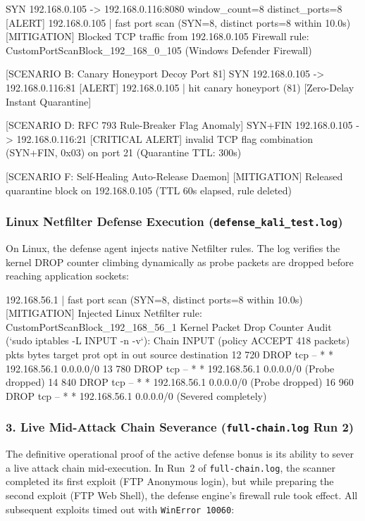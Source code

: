 \begin{logbox}
SYN 192.168.0.105 -> 192.168.0.116:8080  window_count=8  distinct_ports=8
[ALERT] 192.168.0.105 | fast port scan (SYN=8, distinct ports=8 within 10.0s)
[MITIGATION] Blocked TCP traffic from 192.168.0.105
             Firewall rule: CustomPortScanBlock_192_168_0_105 (Windows Defender Firewall)

[SCENARIO B: Canary Honeyport Decoy Port 81]
SYN 192.168.0.105 -> 192.168.0.116:81
[ALERT] 192.168.0.105 | hit canary honeyport (81)  [Zero-Delay Instant Quarantine]

[SCENARIO D: RFC 793 Rule-Breaker Flag Anomaly]
SYN+FIN 192.168.0.105 -> 192.168.0.116:21
[CRITICAL ALERT] invalid TCP flag combination (SYN+FIN, 0x03) on port 21 (Quarantine TTL: 300s)

[SCENARIO F: Self-Healing Auto-Release Daemon]
[MITIGATION] Released quarantine block on 192.168.0.105 (TTL 60s elapsed, rule deleted)
\end{logbox}

\subsubsection{Linux Netfilter Defense Execution (\texttt{defense\_kali\_test.log})}
On Linux, the defense agent injects native Netfilter rules. The log verifies the kernel DROP counter
climbing dynamically as probe packets are dropped before reaching application sockets:

\begin{logbox}
[ALERT] 192.168.56.1 | fast port scan (SYN=8, distinct ports=8 within 10.0s)
[MITIGATION] Injected Linux Netfilter rule: CustomPortScanBlock_192_168_56_1
Kernel Packet Drop Counter Audit (`sudo iptables -L INPUT -n -v`):
  Chain INPUT (policy ACCEPT 418 packets)
  pkts bytes target     prot opt in     out     source          destination
    12   720 DROP       tcp  --  *      *       192.168.56.1    0.0.0.0/0
    13   780 DROP       tcp  --  *      *       192.168.56.1    0.0.0.0/0  (Probe dropped)
    14   840 DROP       tcp  --  *      *       192.168.56.1    0.0.0.0/0  (Probe dropped)
    16   960 DROP       tcp  --  *      *       192.168.56.1    0.0.0.0/0  (Severed completely)
\end{logbox}

\subsubsection{3. Live Mid-Attack Chain Severance (\texttt{full-chain.log} Run 2)}
The definitive operational proof of the active defense bonus is its ability to sever a live attack
chain mid-execution. In Run~2 of \texttt{full-chain.log}, the scanner completed its first exploit
(FTP Anonymous login), but while preparing the second exploit (FTP Web Shell), the defense engine's
firewall rule took effect. All subsequent exploits timed out with \texttt{WinError 10060}:

